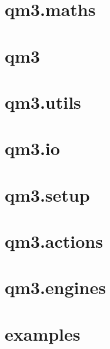 \documentclass[10pt]{article}
\begin{document}
\lhead{} \chead{} \rhead{}
\lfoot{} \cfoot{} \rfoot{\thepage}
\renewcommand{\headrulewidth}{0pt}
\renewcommand{\footrulewidth}{0pt}

\setmainfont{Candara}

\tableofcontents

\newpage

\section{qm3.maths}








\section{qm3}





\section{qm3.utils}






\section{qm3.io}




\section{qm3.setup}


\section{qm3.actions}









\section{qm3.engines}


























\section{examples}


\end{document}
